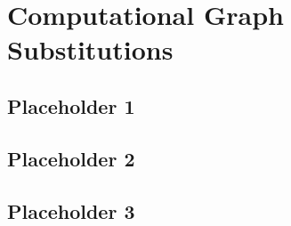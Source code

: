 
\chapter{Computational Graph Substitutions}

\section{Placeholder 1}

\section{Placeholder 2}

\section{Placeholder 3}

